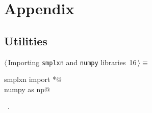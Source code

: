 \documentclass[11pt,oneside]{article}	%
\begin{document}
\appendix
\section{Appendix}
\label{sec:utilities}

\subsection{Utilities}

\begin{flushleft} \small
\begin{minipage}{\linewidth} \label{scrap28}
\protect{}$\langle\,$Importing \texttt{smplxn} and \texttt{numpy} libraries\nobreak\ {\footnotesize 16}$\,\rangle\equiv$
\vspace{-1ex}
\begin{list}{}{} \item
\mbox{}\verb@from smplxn import *@\\
\mbox{}\verb@import numpy as np@\\
\mbox{}\verb@@{\NWsep}
\end{list}
\vspace{-1ex}
\footnotesize\addtolength{\baselineskip}{-1ex}
\begin{list}{}{\setlength{\itemsep}{-\parsep}\setlength{\itemindent}{-\leftmargin}}
\item \NWtxtMacroRefIn\ .
\end{list}
\end{minipage}\\[4ex]
\end{flushleft}
\end{document}
